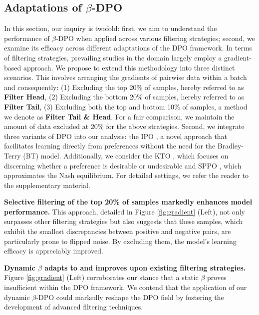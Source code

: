 \subsection{Adaptations of $\beta$-DPO}
\label{exp_adaptation}
In this section, our inquiry is twofold: first, we aim to understand the performance of $\beta$-DPO when applied across various filtering strategies; second, we examine its efficacy across different adaptations of the DPO framework. In terms of filtering strategies, prevailing studies \cite{pruthi2020estimating, xia2024less} in the domain largely employ a gradient-based approach. We propose to extend this methodology into three distinct scenarios. This involves arranging the gradients of pairwise data within a batch and consequently: (1) Excluding the top 20\% of samples, hereby referred to as \textbf{Filter Head},
(2) Excluding the bottom 20\% of samples, hereby referred to as \textbf{Filter Tail},
(3) Excluding both the top and bottom 10\% of samples, a method we denote as \textbf{Filter Tail \& Head}.
For a fair comparison, we maintain the amount of data excluded at 20\% for the above strategies.
Second, we integrate three variants of DPO into our analysis: the IPO \cite{ipo}, a novel approach that facilitates learning directly from preferences without the need for the Bradley-Terry (BT) model. Additionally, we consider the KTO \cite{KTO}, which focuses on discerning whether a preference is desirable or undesirable and SPPO \cite{sppo}, which approximates the Nash equilibrium. For detailed settings, we refer the reader to the supplementary material.

\textbf{Selective filtering of the top 20\% of samples markedly enhances model performance. } This approach, detailed in Figure \ref{fig:gradient} (Left), not only surpasses other filtering strategies but also suggests that these samples, which exhibit the smallest discrepancies between positive and negative pairs, are particularly prone to flipped noise. By excluding them, the model's learning efficacy is appreciably improved.

\textbf{Dynamic $\beta$ adapts to and improves upon existing filtering strategies.} Figure \ref{fig:gradient} (Left) corroborates our stance that a static $\beta$ proves insufficient within the DPO framework. We contend that the application of our dynamic $\beta$-DPO could markedly reshape the DPO field by fostering the development of advanced filtering techniques.

